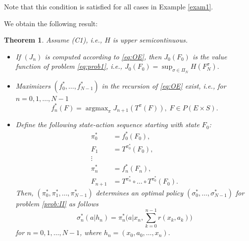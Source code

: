 \documentclass[reqno, 12pt]{amsart}%
\DeclareMathOperator*{\argmax}{argmax}
\newtheorem{theorem}{Theorem}
\theoremstyle{definition}
\numberwithin{equation}{section} \numberwithin{theorem}{section}
\begin{document}
\noindent
Note that this condition is satisfied for all cases in  Example \ref{exam1}.

We obtain the following result:

\begin{theorem}\label{theo:finite_main}
Assume (C1), i.e., $H$ is upper semicontinuous. 
\begin{itemize}
    \item[a)] If $(J_n)$ is computed according to \eqref{eq:OE}, then $J_0(F_0)$
    is the value function of problem \eqref{eq:prob1}, i.e.,
    $J_0(F_0)= \sup_{\sigma\in \Pi_N} H(F_N^\sigma).$
    \item[b)] Maximizers $(f_0^*,\ldots,f_{N-1}^*)$ in the recursion of \eqref{eq:OE} exist, i.e., for $n=0,1,\ldots,N-1$
    $$ f_n^*(F) = \argmax_\pi J_{n+1}(T^\pi(F)),\; F \in P(E\times S).$$
    \item[c)] Define the following state-action sequence starting with state $F_0$:
    \begin{align*}
    \pi_0^* &= f_0^*(F_0),\\
    F_1 &= T^{\pi_0^*}(F_0),\\
    \vdots &\\
    \pi_n^* &= f_n^*(F_n),\\
    F_{n+1} &= T^{\pi_{n}^*}\circ \ldots \circ T^{\pi_0^*}(F_0).
\end{align*}
Then, $(\pi_0^*,\pi_1^*,\ldots,\pi_{N-1}^*)$  determines  an optimal policy $(\sigma_0^*,\ldots, \sigma_{N-1}^*)$ for problem \eqref{prob:II} as follows $$\sigma_n^*(a|h_n)= \pi_n^*\Big(a\Big|x_n, \sum_{k=0}^{n-1}r(x_k,a_k)\Big)$$ for $n=0,1,\ldots,N-1$, where $h_n=(x_0,a_0,\ldots,x_n).$
\end{itemize}


\end{theorem}
\end{document}

